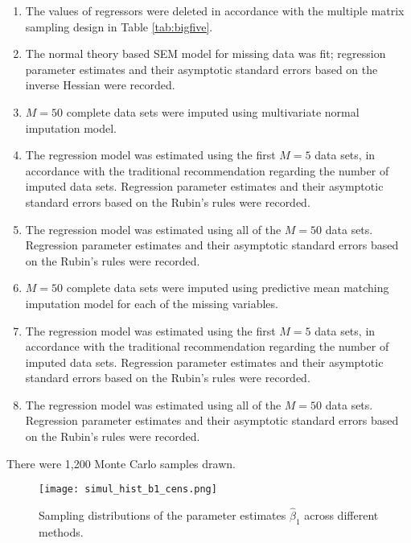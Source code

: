 \documentclass[11pt]{asaproc}
\begin{document}
\begin{enumerate}
        \item The values of regressors were deleted in accordance with
            the multiple matrix sampling design in Table \ref{tab:bigfive}.
        \item The normal theory based SEM model for missing data was fit; regression parameter estimates
            and their asymptotic standard errors based on the inverse Hessian were recorded.
        \item $M=50$ complete data sets were imputed using multivariate normal imputation model.
        \item The regression model was estimated using the first $M=5$ data sets, in accordance with the traditional
            recommendation regarding the number of imputed data sets. Regression parameter estimates
            and their asymptotic standard errors based on the Rubin's rules were recorded.
        \item The regression model was estimated using all of the $M=50$ data sets. Regression parameter estimates
            and their asymptotic standard errors based on the Rubin's rules were recorded.
        \item $M=50$ complete data sets were imputed using predictive mean matching imputation model for each of the missing variables.
        \item The regression model was estimated using the first $M=5$ data sets, in accordance with the traditional
            recommendation regarding the number of imputed data sets. Regression parameter estimates
            and their asymptotic standard errors based on the Rubin's rules were recorded.
        \item The regression model was estimated using all of the $M=50$ data sets. Regression parameter estimates
            and their asymptotic standard errors based on the Rubin's rules were recorded.
\end{enumerate}

There were 1,200 Monte Carlo samples drawn.

\begin{figure}[!bh]
  \centering
  \texttt{[image: simul\_hist\_b1\_cens.png]}
  \caption{Sampling distributions of the parameter estimates $\hat\beta_1$ across different methods.}\label{fig:simul:b1}
\end{figure}
\end{document}
